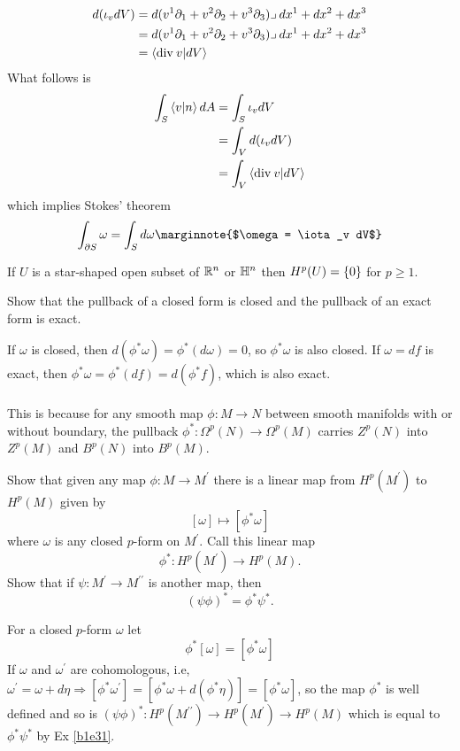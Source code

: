 \documentclass[10pt]{article}
\begin{document}
$$
\begin{aligned}
	d(\iota_v dV) &= d(v^1\partial_1 + v^2\partial_2 + v^3\partial_3) \lrcorner\: dx^1+dx^2+dx^3\\
	&= d(v^1\partial_1 + v^2\partial_2 + v^3\partial_3) \lrcorner\: dx^1+dx^2+dx^3\\
	&= \ip{{\rm div }\:v}{dV}
\end{aligned}
$$
What follows is
$$
\begin{aligned}
	\int_S\ip{v}{n}dA &= \int_S\iota_v dV\\
	&= \int_Vd(\iota_v dV)\\
	&= \int_V\ip{{\rm div }\:v}{dV}
\end{aligned}
$$
which implies Stokes' theorem
$$
	\int_{\partial S} \omega = \int_{S} d\omega\marginnote{$\omega = \iota_v dV$}
$$


\begin{definition}
	 If $U$ is a star-shaped open subset of $\mathbb{R}^n$ or $\mathbb{H}^n$ then $H^p(U)= \lbrace0\rbrace$ for $p \ge 1$.
\end{definition}


\begin{example}\label{b1e98}
	Show that the pullback of a closed form is closed and the pullback of an exact form is exact.
\end{example}
\sol If $\omega$ is closed, then $d(\phi^*\omega) = \phi^*(d\omega) = 0$, so $\phi^*\omega$ is also closed. If $\omega = df$ is exact, then $\phi^*\omega = \phi^*(df) = d(\phi^*f)$, which is also exact.\\\\
This is because for any smooth map $\phi:M\to N$ between smooth manifolds with or without boundary, the pullback $\phi^*:\Omega^p(N) \to \Omega^p(M)$ carries $Z^p(N)$ into $Z^p(M)$ and $B^p(N)$ into $B^p(M)$.


\begin{example}\label{b1e99}
	Show that given any map $\phi:M\to M^\prime$ there is a linear map from $H^p(M^\prime)$ to $H^p(M)$ given by
	$$
		[\omega] \mapsto [\phi^*\omega]
	$$
	where $\omega$ is any closed $p$-form on $M^\prime$. Call this linear map
	$$
	\phi^*:H^p(M^\prime) \to H^p(M).
	$$
	Show that if $\psi: M^\prime \to M^{\prime\prime}$ is another map, then
	$$
	(\psi\phi)^* = \phi^*\psi^*.
	$$
\end{example}
\sol For a closed $p$-form $\omega$ let
$$
	\phi^*[\omega] = [\phi^*\omega]
$$
If $\omega$ and $\omega^\prime$ are cohomologous, i.e, $\omega^\prime = \omega + d\eta \Rightarrow [\phi^*\omega^\prime] = [\phi^*\omega + d(\phi^*\eta)] = [\phi^*\omega]$, so the map $\phi^*$ is well defined and so is $(\psi\phi)^*:H^p(M^{\prime\prime}) \to H^p(M^\prime) \to H^p(M)$ which is equal to $\phi^*\psi^*$ by Ex \ref{b1e31}.
\end{document}
